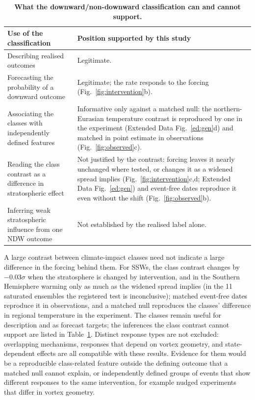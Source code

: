 \documentclass[11pt]{article}
\begin{document}
\begin{table}[t]
\centering
\caption{\textbf{What the downward/non-downward classification can and cannot support.}}\label{tab:uses}
{\small\renewcommand{\arraystretch}{1.25}
\begin{tabular}{@{}>{\raggedright\arraybackslash}p{6.6cm}>{\raggedright\arraybackslash}p{8.6cm}@{}}
\toprule
\textbf{Use of the classification} & \textbf{Position supported by this study} \\
\midrule
Describing realised outcomes & Legitimate. \\
Forecasting the probability of a downward outcome & Legitimate; the rate responds to the forcing (Fig.~\ref{fig:intervention}b). \\
Associating the classes with independently defined features & Informative only against a matched null: the northern-Eurasian temperature contrast is reproduced by one in the experiment (Extended Data Fig.~\ref{ed:gen}d) and matched in point estimate in observations (Fig.~\ref{fig:observed}c). \\
Reading the class contrast as a difference in stratospheric effect & Not justified by the contrast: forcing leaves it nearly unchanged where tested, or changes it as a widened spread implies (Fig.~\ref{fig:intervention}c,d; Extended Data Fig.~\ref{ed:gen}) and event-free dates reproduce it even without the shift (Fig.~\ref{fig:observed}b). \\
Inferring weak stratospheric influence from one NDW outcome & Not established by the realised label alone. \\
\bottomrule
\end{tabular}}
\end{table}

A large contrast between climate-impact classes need not indicate a large difference in the forcing behind them. For SSWs, the class contrast changes by $-0.03\sigma$ when the stratosphere is changed by intervention, and in the Southern Hemisphere warming only as much as the widened spread implies (in the 11 saturated ensembles the registered test is inconclusive); matched event-free dates reproduce it in observations, and a matched null reproduces the classes' difference in regional temperature in the experiment. The classes remain useful for description and as forecast targets; the inferences the class contrast cannot support are listed in Table~\ref{tab:uses}. Distinct response types are not excluded: overlapping mechanisms, responses that depend on vortex geometry, and state-dependent effects are all compatible with these results. Evidence for them would be a reproducible class-related feature outside the defining outcome that a matched null cannot explain, or independently defined groups of events that show different responses to the same intervention, for example nudged experiments that differ in vortex geometry.
\end{document}
